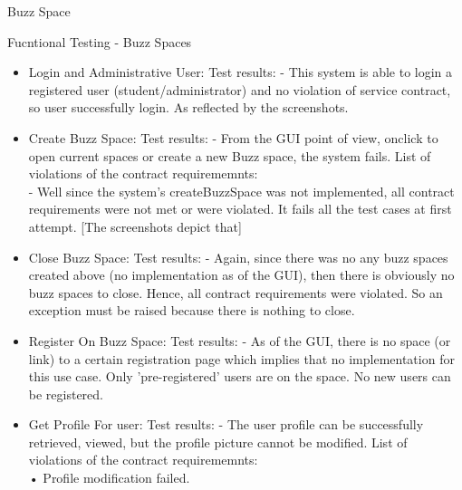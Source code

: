 \item Buzz Space

Fucntional Testing - Buzz Spaces

\begin{itemize}

\item Login and Administrative User:
Test results:
- This system is able to login a registered user (student/administrator) and no violation of service contract, so user successfully login. As reflected by the screenshots.

\item Create Buzz Space:
Test results:
- From the GUI point of view, onclick to open current spaces or create a new Buzz space, the system fails.
List of violations of the contract requirememnts:\\
- Well since the system's createBuzzSpace was not implemented, all contract requirements were not met or were violated. It fails all the test cases at first attempt. [The screenshots depict that]\\


\item Close Buzz Space:
Test results:
- Again, since there was no any buzz spaces created above (no implementation as of the GUI), then there is obviously no buzz spaces to close. Hence, all contract requirements were violated. So an exception must be raised because there is nothing to close.\\

\item Register On Buzz Space:
Test results:
- As of the GUI, there is no space (or link) to a certain registration page which implies that no implementation for this use case. Only 'pre-registered' users are on the space. No new users can be registered. \\


\item Get Profile For user:
Test results:
- The user profile can be successfully retrieved, viewed, but the profile picture cannot be modified.
List of violations of the contract requirememnts:\\
• Profile modification failed.



\end{itemize}